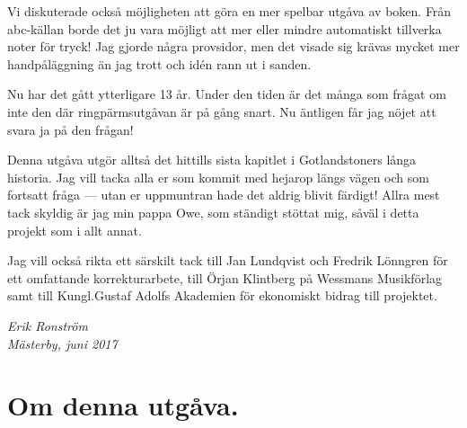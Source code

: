 {Vi diskuterade också möjligheten att göra en mer \guillemotright{}spelbar\guillemotright{}
utgåva av boken. Från abc-källan borde det ju vara möjligt att mer eller mindre
automatiskt tillverka noter för tryck! Jag gjorde några provsidor, men det visade sig
krävas mycket mer \guillemotright{}handpåläggning\guillemotright{} än jag trott och idén rann ut i sanden.

Nu har det gått ytterligare 13 år. Under den tiden är det många som frågat om inte
den där ringpärmsutgåvan är på gång snart. Nu äntligen får jag nöjet att svara ja på den frågan!

\bigskip

{
\setlength{\parindent}{0em}
Denna utgåva utgör alltså det hittills sista kapitlet i
Gotlandstoners långa historia. Jag vill tacka alla er som kommit med hejarop längs vägen
och som fortsatt fråga --- utan er uppmuntran hade det aldrig blivit färdigt! Allra mest
tack skyldig är jag min pappa Owe, som ständigt stöttat mig, såväl i detta projekt som i allt annat.
}

Jag vill också rikta ett särskilt tack till Jan Lundqvist och Fredrik Lönngren för ett omfattande
korrekturarbete, till Örjan Klintberg på Wessmans Musikförlag samt till Kungl.\@ Gustaf Adolfs Akademien
för ekonomiskt bidrag till projektet.

\bigskip

\begin{flushright}
\textit{Erik Ronström} \\
\textit{Mästerby, juni 2017}
\end{flushright}


\clearpage


\section*{\centering \LARGE Om denna utgåva.}\vspace{8mm}



\makeatletter
\renewcommand\paragraph{\@startsection{paragraph}{4}{\z@}%
                                    {3.0ex \@plus1ex \@minus.2ex}%
                                    {-1em}%
                                    {\normalfont\normalsize\bfseries}}

}
